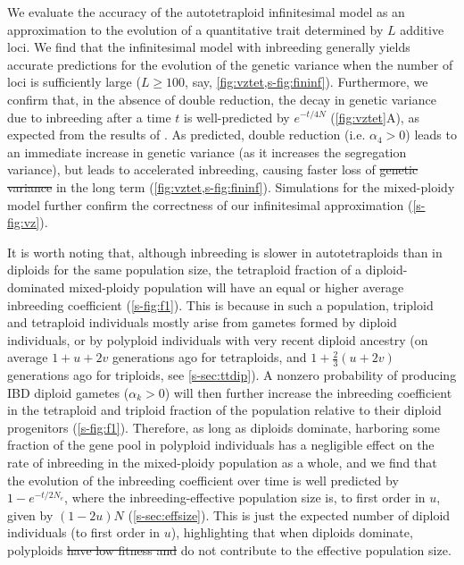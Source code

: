 \documentclass[12pt,a4paper]{article}
\providecommand{\DIFadd}[1]{{\protect\color{blue}\uwave{#1}}} %
\providecommand{\DIFdel}[1]{{\protect\color{red}\sout{#1}}}                      %
\providecommand{\DIFaddbegin}{} %
\providecommand{\DIFaddend}{} %
\providecommand{\DIFdelbegin}{} %
\providecommand{\DIFdelend}{} %
\begin{document}
We evaluate the accuracy of the autotetraploid infinitesimal model as an
approximation to the evolution of a quantitative trait determined by $L$
additive loci.
We find that the infinitesimal model with inbreeding generally yields accurate
predictions for the evolution of the genetic variance when the number of loci
is sufficiently large ($L \ge 100$, say, \cref{fig:vztet,s-fig:fininf}).
Furthermore, we confirm that, in the absence of double reduction, the decay in
genetic variance due to inbreeding after a time $t$ is well-predicted by
$e^{-t/4N}$ (\cref{fig:vztet}A), as expected from the results of \cite{arnold2012}.
As predicted, double reduction (i.e. $\alpha_4 > 0$) leads to an immediate
increase in genetic variance (as it increases the segregation variance), but
leads to accelerated inbreeding, causing faster loss of \DIFdelbegin \DIFdel{genetic variance }\DIFdelend \DIFaddbegin \DIFadd{variation }\DIFaddend in the
long term (\cref{fig:vztet,s-fig:fininf}).
Simulations for the mixed-ploidy model further confirm the correctness of our
infinitesimal approximation (\cref{s-fig:vz}).

It is worth noting that, although inbreeding is slower in autotetraploids than
in diploids for the same population size, the tetraploid fraction of a
diploid-dominated mixed-ploidy population will have an equal or higher average
inbreeding coefficient (\cref{s-fig:f1}).
This is because in such a population, triploid and tetraploid individuals
mostly arise from gametes formed by diploid individuals, or by polyploid
individuals with very recent diploid ancestry (on average $1+u+2v$ generations ago
for tetraploids, and $1+\frac{2}{3}(u+2v)$ generations ago for triploids, see
\cref{s-sec:ttdip}).
A nonzero probability of producing IBD diploid gametes ($\alpha_k > 0$) will
then further increase the inbreeding coefficient in the tetraploid and triploid
fraction of the population relative to their diploid progenitors
(\cref{s-fig:f1}).
Therefore, as long as diploids dominate, harboring some fraction of the gene
pool in polyploid individuals has a negligible effect on the rate of inbreeding
in the mixed-ploidy population as a whole, and we find that the evolution of
the inbreeding coefficient over time is well predicted by $1-e^{-t/2N_e}$,
where the inbreeding-effective population size is, to first order in $u$, given
by $(1-2u)N$ (\cref{s-sec:effsize}). This is just the expected number of
diploid individuals (to first order in $u$), highlighting that when diploids
dominate, polyploids \DIFdelbegin \DIFdel{have low fitness and }\DIFdelend do not contribute to the effective population size. 
\end{document}
